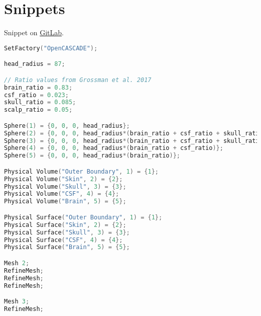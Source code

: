 \pagebreak
\chapter{Snippets}
\label{appndx:snippets}

\noindent Snippet on \href{https://gitlab.com/ttis-simulations/ttis-software/-/snippets/2043270}{GitLab}.
\begin{lstlisting}[language=C,caption={Sphere \gls{CAD} model generation code in \texttt{geo} format},captionpos=b, label=lst:sphere_code]
SetFactory("OpenCASCADE");

head_radius = 87;

// Ratio values from Grossman et al. 2017
brain_ratio = 0.83;
csf_ratio = 0.023;
skull_ratio = 0.085;
scalp_ratio = 0.05;

Sphere(1) = {0, 0, 0, head_radius};
Sphere(2) = {0, 0, 0, head_radius*(brain_ratio + csf_ratio + skull_ratio + scalp_ratio)};
Sphere(3) = {0, 0, 0, head_radius*(brain_ratio + csf_ratio + skull_ratio)};
Sphere(4) = {0, 0, 0, head_radius*(brain_ratio + csf_ratio)};
Sphere(5) = {0, 0, 0, head_radius*(brain_ratio)};

Physical Volume("Outer Boundary", 1) = {1};
Physical Volume("Skin", 2) = {2};
Physical Volume("Skull", 3) = {3};
Physical Volume("CSF", 4) = {4};
Physical Volume("Brain", 5) = {5};

Physical Surface("Outer Boundary", 1) = {1};
Physical Surface("Skin", 2) = {2};
Physical Surface("Skull", 3) = {3};
Physical Surface("CSF", 4) = {4};
Physical Surface("Brain", 5) = {5};

Mesh 2;
RefineMesh;
RefineMesh;
RefineMesh;

Mesh 3;
RefineMesh;
\end{lstlisting}

